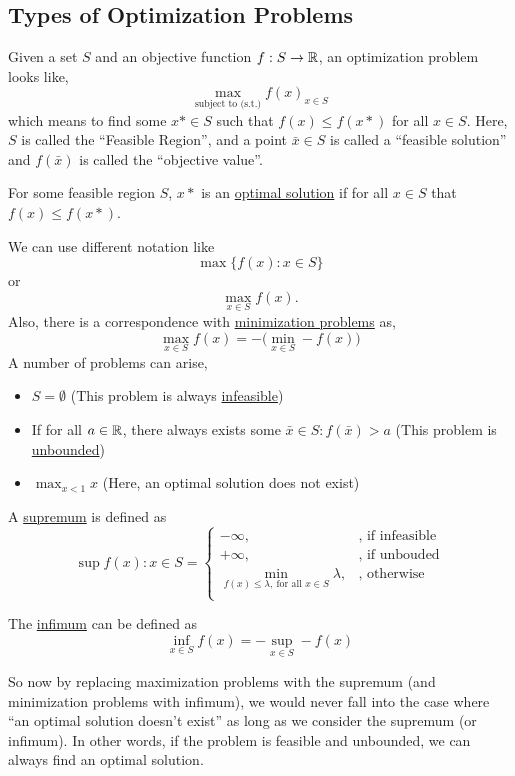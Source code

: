 \documentclass[11pt]{article}
\begin{document}
\subsection{Types of Optimization Problems}
Given a set $S$ and an objective function $f: S \to \mathbb{R}$, an optimization problem
looks like,
\begin{equation*}
\max_{\text{subject to (s.t.)}} f(x)_{x \in S}
\end{equation*}
which means to find some $x* \in S$ such that $f(x) \leq f(x*)$ for all $x \in
S$. Here, $S$ is called the ``Feasible Region'', and a point $\bar x \in S$ is
called a ``feasible solution'' and $f(\bar x)$ is called the ``objective
value''.
\begin{definition}
For some feasible region $S$, $x*$ is an \underline{optimal solution} if for all
$x \in S$ that $f(x) \leq f(x*)$.
\end{definition}
We can use different notation like
\begin{equation*}
\max \{f(x) : x\in S \}
\end{equation*}
or
\begin{equation*}
\max_{x \in S} f(x).
\end{equation*}
Also, there is a correspondence with \underline{minimization problems} as,
\begin{equation*}
\max_{x \in S} f(x) = -\bigg( \min_{x \in S} -f(x) \bigg) 
\end{equation*}
A number of problems can arise,
\begin{itemize}
\item $S = \emptyset$ (This problem is always \underline{infeasible})
\item If for all $a \in \mathbb{R}$, there always exists some $\bar x \in S: f(\bar x)
> a$ (This problem is \underline{unbounded})
\item $\max_{x < 1} x$ (Here, an optimal solution does not exist)
\end{itemize}
\begin{definition}
A \underline{supremum} is defined as \begin{equation*}
\sup{f(x):x \in S} =
\begin{cases}
- \infty,& \text{, if infeasible}\\
+ \infty,& \text{, if unbouded}\\
\min_{f(x) \leq \lambda,\>\text{for all } x \in S}\lambda, &\text{, otherwise}\\
\end{cases}
\end{equation*}
\end{definition}
\begin{definition}
The \underline{infimum} can be defined as
\begin{equation*}
\inf_{x \in S} f(x) = - \sup_{x \in S} -f(x)
\end{equation*}
\end{definition}
So now by replacing maximization problems with the supremum (and minimization
problems with infimum), we would never fall into the case where ``an optimal
solution doesn't exist'' as long as we consider the supremum (or infimum). In
other words, if the problem is feasible and unbounded, we can always find an
optimal solution.
\end{document}

